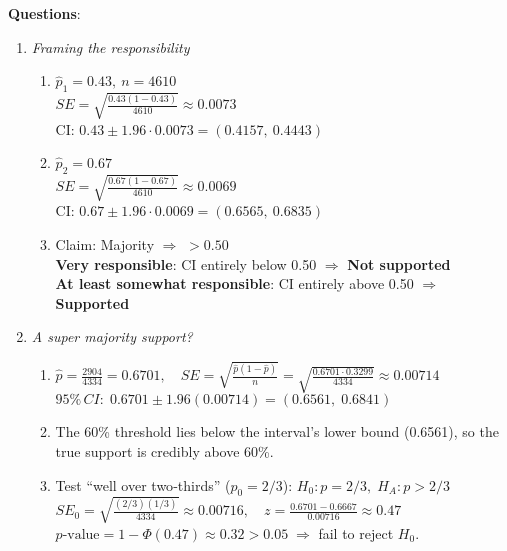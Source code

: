 \documentclass{article}
\begin{document}
\textbf{Questions}:
\begin{enumerate}  %
\item \emph{Framing the responsibility}
\begin{enumerate}[label=(\alph*)]
    \item
    $\hat{p}_1 = 0.43,\ n = 4610$ \\
    $SE = \sqrt{\frac{0.43(1 - 0.43)}{4610}} \approx 0.0073$ \\
    CI: $0.43 \pm 1.96 \cdot 0.0073 = (0.4157,\ 0.4443)$

    \item
    $\hat{p}_2 = 0.67$ \\
    $SE = \sqrt{\frac{0.67(1 - 0.67)}{4610}} \approx 0.0069$ \\
    CI: $0.67 \pm 1.96 \cdot 0.0069 = (0.6565,\ 0.6835)$

    \item
    Claim: Majority $\Rightarrow$ $> 0.50$ \\
    \textbf{Very responsible}: CI entirely below 0.50 $\Rightarrow$ \textbf{Not supported} \\
    \textbf{At least somewhat responsible}: CI entirely above 0.50 $\Rightarrow$ \textbf{Supported}
\end{enumerate}

\item \emph{A super majority support?}
\begin{enumerate}[label=(\alph*)]
  \item $\displaystyle \hat p = \frac{2904}{4334}=0.6701,\quad SE=\sqrt{\frac{\hat p(1-\hat p)}{n}}=\sqrt{\frac{0.6701\cdot0.3299}{4334}}\approx0.00714$\\
        $95\%\,CI:\;0.6701\pm1.96(0.00714)=(0.6561,\;0.6841)$
  \item The 60\% threshold lies below the interval’s lower bound (0.6561), so the true support is credibly above 60\%.
  \item Test “well over two‐thirds” ($p_0=2/3$):
        $H_0:p=2/3,\;H_A:p>2/3$\\
        $SE_0=\sqrt{\frac{(2/3)(1/3)}{4334}}\approx0.00716,\quad
         z=\frac{0.6701-0.6667}{0.00716}\approx0.47$\\
        $p\text{-value}=1-\Phi(0.47)\approx0.32>0.05\;\Rightarrow$ fail to reject $H_0$.
\end{enumerate}


\end{enumerate}
\end{document}
